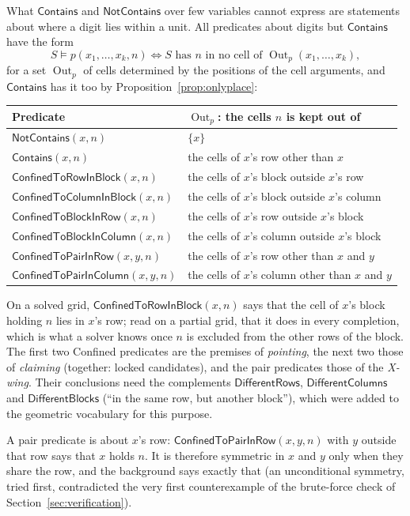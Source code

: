 \documentclass[11pt,a4paper]{article}
\theoremstyle{definition}
\theoremstyle{remark}
\newcommand{\pred}[1]{\mathsf{#1}}
\newcommand{\Contains}{\pred{Contains}}
\newcommand{\NotContains}{\pred{NotContains}}
\newcommand{\Bad}{\operatorname{Out}}
\newcommand{\sat}{\models}
\begin{document}
What $\Contains$ and $\NotContains$ over few variables cannot express are statements about where a digit lies within a unit. All predicates about digits but $\Contains$ have the form
\[
  S \sat p(x_1, \dots, x_k, n) \iff \text{$S$ has $n$ in no cell of } \Bad_p(x_1, \dots, x_k),
\]
for a set $\Bad_p$ of cells determined by the positions of the cell arguments, and $\Contains$ has it too by Proposition~\ref{prop:onlyplace}:
\begin{center}\small
\begin{tabular}{@{}ll@{}}
\toprule
Predicate & $\Bad_p$: the cells $n$ is kept out of \\
\midrule
$\NotContains(x, n)$ & $\{x\}$ \\
$\Contains(x, n)$ & the cells of $x$'s row other than $x$ \\
$\pred{ConfinedToRowInBlock}(x, n)$ & the cells of $x$'s block outside $x$'s row \\
$\pred{ConfinedToColumnInBlock}(x, n)$ & the cells of $x$'s block outside $x$'s column \\
$\pred{ConfinedToBlockInRow}(x, n)$ & the cells of $x$'s row outside $x$'s block \\
$\pred{ConfinedToBlockInColumn}(x, n)$ & the cells of $x$'s column outside $x$'s block \\
$\pred{ConfinedToPairInRow}(x, y, n)$ & the cells of $x$'s row other than $x$ and $y$ \\
$\pred{ConfinedToPairInColumn}(x, y, n)$ & the cells of $x$'s column other than $x$ and $y$ \\
\bottomrule
\end{tabular}
\end{center}
On a solved grid, $\pred{ConfinedToRowInBlock}(x, n)$ says that the cell of $x$'s block holding $n$ lies in $x$'s row; read on a partial grid, that it does in every completion, which is what a solver knows once $n$ is excluded from the other rows of the block. The first two Confined predicates are the premises of \emph{pointing}, the next two those of \emph{claiming} (together: locked candidates), and the pair predicates those of the \emph{X-wing}. Their conclusions need the complements $\pred{DifferentRows}$, $\pred{DifferentColumns}$ and $\pred{DifferentBlocks}$ (``in the same row, but another block''), which were added to the geometric vocabulary for this purpose.

A pair predicate is about $x$'s row: $\pred{ConfinedToPairInRow}(x, y, n)$ with $y$ outside that row says that $x$ holds $n$. It is therefore symmetric in $x$ and $y$ only when they share the row, and the background says exactly that (an unconditional symmetry, tried first, contradicted the very first counterexample of the brute-force check of Section~\ref{sec:verification}).
\end{document}
